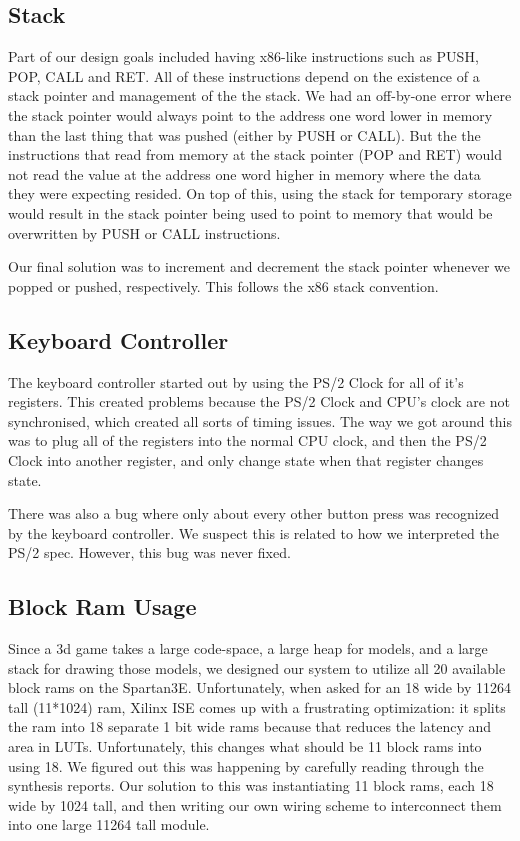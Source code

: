 \documentclass[onecolumn]{IEEEtran}
\begin{document}
\subsection{Stack}
Part of our design goals included having x86-like instructions such as PUSH, POP, CALL and RET.  All of these instructions depend on the existence of a stack pointer and management of the the stack.  We had an off-by-one error where the stack pointer would always point to the address one word lower in memory than the last thing that was pushed (either by PUSH or CALL).  But the the instructions that read from memory at the stack pointer (POP and RET) would not read the value at the address one word higher in memory where the data they were expecting resided.  On top of this, using the stack for temporary storage would result in the stack pointer being used to point to memory that would be overwritten by PUSH or CALL instructions.

Our final solution was to increment and decrement the stack pointer whenever we popped or pushed, respectively.  This follows the x86 stack convention.

\subsection{Keyboard Controller}
The keyboard controller started out by using the PS/2 Clock for all of it's registers.  This created problems because the PS/2 Clock and CPU's clock are not synchronised, which created all sorts of timing issues.  The way we got around this was to plug all of the registers into the normal CPU clock, and then the PS/2 Clock into another register, and only change state when that register changes state.

There was also a bug where only about every other button press was recognized by the keyboard controller.  We suspect this is related to how we interpreted the PS/2 spec.  However, this bug was never fixed.
 
\subsection{Block Ram Usage}
Since a 3d game takes a large code-space, a large heap for models, and a large stack for drawing those models, we designed our system to utilize all 20 available block rams on the Spartan3E.  Unfortunately, when asked for an 18 wide by 11264 tall (11*1024) ram, Xilinx ISE comes up with a frustrating optimization: it splits the ram into 18 separate 1 bit wide rams because that reduces the latency and area in LUTs.  Unfortunately, this changes what should be 11 block rams into using 18.  We figured out this was happening by carefully reading through the synthesis reports.  Our solution to this was instantiating 11 block rams, each 18 wide by 1024 tall, and then writing our own wiring scheme to interconnect them into one large 11264 tall module.
\end{document}
